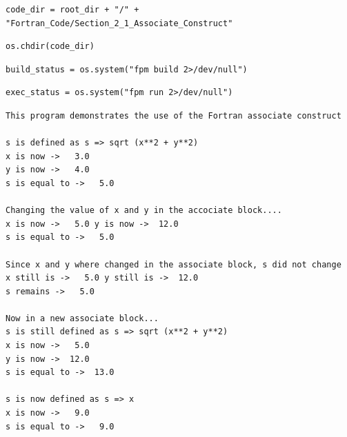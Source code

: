 \begin{verbatim}
code_dir = root_dir + "/" + "Fortran_Code/Section_2_1_Associate_Construct"
\end{verbatim}

\begin{verbatim}
os.chdir(code_dir)
\end{verbatim}

\begin{verbatim}
build_status = os.system("fpm build 2>/dev/null")
\end{verbatim}

\begin{verbatim}
exec_status = os.system("fpm run 2>/dev/null")
\end{verbatim}

\begin{verbatim}
This program demonstrates the use of the Fortran associate construct

s is defined as s => sqrt (x**2 + y**2)
x is now ->   3.0
y is now ->   4.0
s is equal to ->   5.0

Changing the value of x and y in the accociate block....
x is now ->   5.0 y is now ->  12.0
s is equal to ->   5.0

Since x and y where changed in the associate block, s did not change
x still is ->   5.0 y still is ->  12.0
s remains ->   5.0

Now in a new associate block...
s is still defined as s => sqrt (x**2 + y**2)
x is now ->   5.0
y is now ->  12.0
s is equal to ->  13.0

s is now defined as s => x
x is now ->   9.0
s is equal to ->   9.0
\end{verbatim}